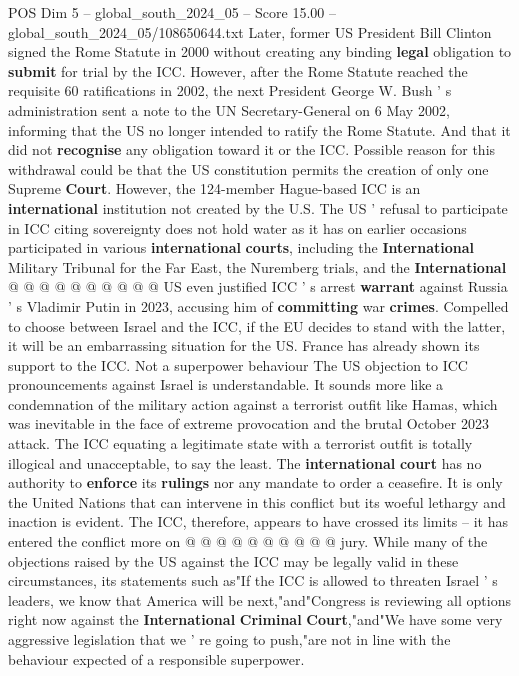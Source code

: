 \begin{textsample}{POS Dim 5 – global\_south\_2024\_05 – Score 15.00 – global\_south\_2024\_05/108650644.txt}
Later, former US President Bill Clinton signed the Rome Statute in 2000 without creating any binding \textbf{legal} obligation to \textbf{submit} for trial by the ICC.
However, after the Rome Statute reached the requisite 60 ratifications in 2002, the next President George W.
Bush ' s administration sent a note to the UN Secretary-General on 6 May 2002, informing that the US no longer intended to ratify the Rome Statute.
And that it did not \textbf{recognise} any obligation toward it or the ICC.
Possible reason for this withdrawal could be that the US constitution permits the creation of only one Supreme \textbf{Court}.
However, the 124-member Hague-based ICC is an \textbf{international} institution not created by the U.S.
The US ' refusal to participate in ICC citing sovereignty does not hold water as it has on earlier occasions participated in various \textbf{international} \textbf{courts}, including the \textbf{International} Military Tribunal for the Far East, the Nuremberg trials, and the \textbf{International} @ @ @ @ @ @ @ @ @ @ US even justified ICC ' s arrest \textbf{warrant} against Russia ' s Vladimir Putin in 2023, accusing him of \textbf{committing} war \textbf{crimes}.
Compelled to choose between Israel and the ICC, if the EU decides to stand with the latter, it will be an embarrassing situation for the US.
France has already shown its support to the ICC.
Not a superpower behaviour The US objection to ICC pronouncements against Israel is understandable.
It sounds more like a condemnation of the military action against a terrorist outfit like Hamas, which was inevitable in the face of extreme provocation and the brutal October 2023 attack.
The ICC equating a legitimate state with a terrorist outfit is totally illogical and unacceptable, to say the least.
The \textbf{international} \textbf{court} has no authority to \textbf{enforce} its \textbf{rulings} nor any mandate to order a ceasefire.
It is only the United Nations that can intervene in this conflict but its woeful lethargy and inaction is evident.
The ICC, therefore, appears to have crossed its limits -- it has entered the conflict more on @ @ @ @ @ @ @ @ @ @ jury.
While many of the objections raised by the US against the ICC may be legally valid in these circumstances, its statements such as"If the ICC is allowed to threaten Israel ' s leaders, we know that America will be next,"and"Congress is reviewing all options right now against the \textbf{International} \textbf{Criminal} \textbf{Court},"and"We have some very aggressive legislation that we ' re going to push,"are not in line with the behaviour expected of a responsible superpower.

\end{textsample}
